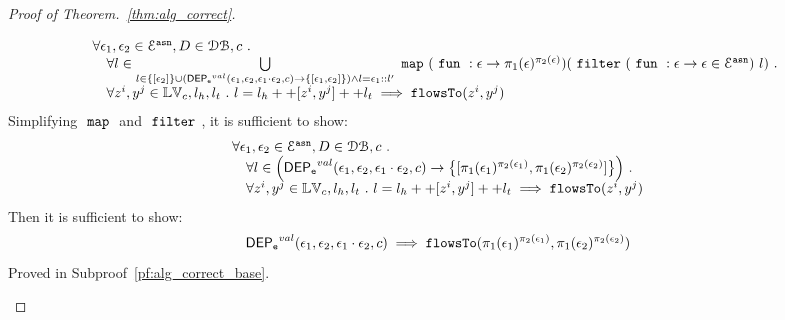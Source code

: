 \begin{proof}[Proof of Theorem.~\ref{thm:alg_correct}]
\begin{case}
\[\begin{array}{l}
  \forall \mathtt{\epsilon}_1, \mathtt{\epsilon}_2 \in \mathcal{E}^{\mathtt{{asn}}}, D \in \mathcal{DB} , c ~.~
  \\ \quad 
   \forall l \in  \bigcup\limits_{l \in \{[\mathtt{\epsilon}_2]\} \cup
   (\mathsf{DEP_{\mathtt{e}}}^{val}(\mathtt{\epsilon}_1, \mathtt{\epsilon}_2, \mathtt{\epsilon}_1 \cdot \mathtt{\epsilon}_2, c) \to
       \{[\mathtt{\epsilon}_1, \mathtt{\epsilon}_2]\}) \land l = \mathtt{\epsilon}_1 :: l'}
  ~\mathtt{map}~ 
  (~\mathtt{fun}~ : \mathtt{\epsilon} \to \pi_1(\mathtt{\epsilon})^{\pi_2(\mathtt{\epsilon})})  
  (~\mathtt{filter}~ 
    (~\mathtt{fun}~ : \mathtt{\epsilon} \to  \mathtt{\epsilon} \in \mathcal{E}^{\mathtt{{asn}}}) ~ l)
 ~.~
   \\ \quad 
   \forall z^i, y^j \in \mathbb{LV}_c, l_h, l_t ~.~ 
   l = l_h ++ [z^i, y^j] ++ l_t 
   \implies \mathtt{flowsTo}(z^i, y^j)
\end{array}
\]
%
Simplifying $~\mathtt{map}~$ and $~\mathtt{filter}~$, it is sufficient to show:
\[
\begin{array}{l}
  \forall \event_1, \event_2 \in \eventset^{\asn}, D \in \dbdom , c \st
  \\ \quad 
   \forall l \in 
   \left(\eventdep^{val}(\event_1, \event_2, \event_1 \cdot \event_2, c) \to 
       \left\{[\pi_1(\event_1)^{\pi_2(\event_1)}, \pi_1(\event_2)^{\pi_2(\event_2)}] \right \}\right )
 \st
   \\ \quad 
   \forall z^i, y^j \in \lvar_c, l_h, l_t \st 
   l = l_h ++ [z^i, y^j] ++ l_t 
   \implies \flowsto(z^i, y^j)
\end{array}
\]
%
Then it is sufficient to show:
%
\[
  \mathsf{DEP_{\mathtt{e}}}^{val}(\mathtt{\epsilon}_1, \mathtt{\epsilon}_2, \mathtt{\epsilon}_1 \cdot \mathtt{\epsilon}_2, c) \implies \mathtt{flowsTo}(\pi_1(\mathtt{\epsilon}_1)^{\pi_2(\mathtt{\epsilon}_1)}, \pi_1(\mathtt{\epsilon}_2)^{\pi_2(\mathtt{\epsilon}_2)})
\]
% 
Proved in Subproof~\ref{pf:alg_correct_base}.


\end{case}
\end{proof}
